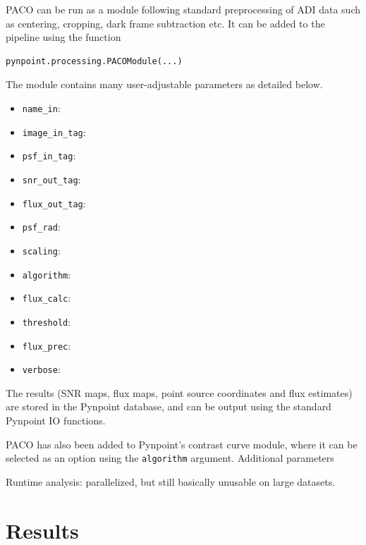 \documentclass[twocolumn,fleqn]{aastex62}
\begin{document}
PACO can be run as a module following standard preprocessing of ADI data such as centering, cropping, dark frame subtraction etc.
It can be added to the pipeline using the function 
\begin{verbatim}
pynpoint.processing.PACOModule(...)
\end{verbatim}
The module contains many user-adjustable parameters as detailed below.
\begin{itemize}
	\item[] \verb|name_in|:
	\item[] \verb|image_in_tag|:
	\item[] \verb|psf_in_tag|:
	\item[] \verb|snr_out_tag|:
	\item[] \verb|flux_out_tag|:
	\item[] \verb|psf_rad|:
	\item[] \verb|scaling|:
	\item[] \verb|algorithm|:
	\item[] \verb|flux_calc|:
	\item[] \verb|threshold|:
	\item[] \verb|flux_prec|:
	\item[] \verb|verbose|:
\end{itemize}
The results (SNR maps, flux maps, point source coordinates and flux estimates) are stored in the Pynpoint database, and can be output using the standard Pynpoint IO functions.

PACO has also been added to Pynpoint's contrast curve module, where it can be selected as an option using the \verb|algorithm| argument. Additional parameters 

Runtime analysis: parallelized, but still basically unusable on large datasets.
\section{Results}
\end{document}
